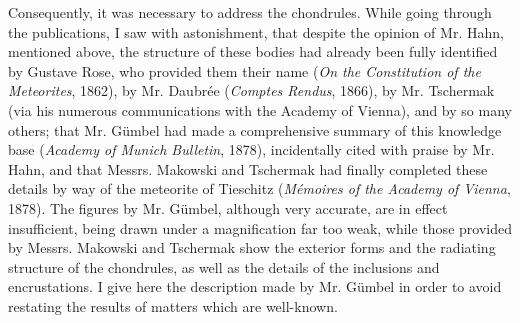 \documentclass[a4paper, 12pt, oneside]{article}
\begin{document}
Consequently, it was necessary to address the chondrules. While going through the publications, I saw with astonishment, that despite the opinion of Mr. Hahn, mentioned above, the structure of these bodies had already been fully identified by Gustave Rose, who provided them their name (\emph{On the Constitution of the Meteorites}, 1862), by Mr. Daubrée (\emph{Comptes Rendus}, 1866), by Mr. Tschermak (via his numerous communications with the Academy of Vienna), and by so many others; that Mr. Gümbel had made a comprehensive summary of this knowledge base (\emph{Academy of Munich Bulletin}, 1878), incidentally cited with praise by Mr. Hahn, and that Messrs. Makowski and Tschermak had finally completed these details by way of the meteorite of Tieschitz (\emph{Mémoires of the Academy of Vienna}, 1878). The figures by Mr. Gümbel, although very accurate, are in effect insufficient, being drawn under a magnification far too weak, while those provided by Messrs. Makowski and Tschermak show the exterior forms and the radiating structure of the chondrules, as well as the details of the inclusions and encrustations. I give here the description made by Mr. Gümbel in order to avoid restating the results of matters which are well-known.
\end{document}
